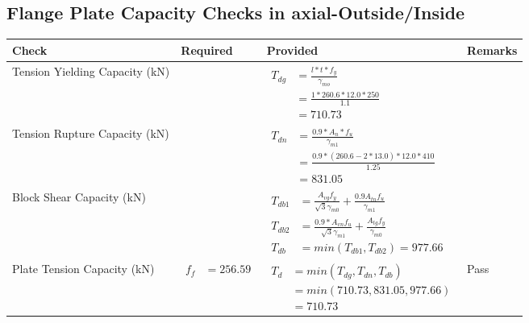 \documentclass{article}%
\begin{document}
\subsection{Flange Plate Capacity Checks in axial{-}Outside/Inside }%
\label{subsec:FlangePlateCapacityChecksinaxial{-}Outside/Inside}%
\renewcommand{\arraystretch}{1.2}%
\begin{longtable}{|p{4cm}|p{6cm}|p{5.5cm}|p{1.5cm}|}%
\hline%
\rowcolor{OsdagGreen}%
Check&Required&Provided&Remarks\\%
\hline%
\endhead%
\hline%
Tension Yielding Capacity (kN)&&$\begin{aligned} T_{dg} &= \frac{l*t*f_y}{\gamma_{mo}}\\ &=\frac{1*260.6*12.0*250}{1.1}\\ &=710.73\end{aligned}$&\\%
\hline%
Tension Rupture Capacity (kN)&&$\begin{aligned} T_{dn} &= \frac{0.9*A_{n}*f_u}{\gamma_{m1}}\\ &=\frac{0.9*(260.6-2*13.0)*12.0*410}{1.25}\\ &=831.05\end{aligned}$&\\%
\hline%
Block Shear Capacity (kN)&&$\begin{aligned}T_{db1} &= \frac{A_{vg} f_{y}}{\sqrt{3} \gamma_{m0}} + \frac{0.9 A_{tn} f_{u}}{\gamma_{m1}}\\ T_{db2} &= \frac{0.9*A_{vn} f_{u}}{\sqrt{3} \gamma_{m1}} + \frac{A_{tg} f_{y}}{\gamma_{m0}}\\ T_{db} &= min(T_{db1}, T_{db2})= 977.66\end{aligned}$&\\%
\hline%
Plate Tension Capacity (kN)&$\begin{aligned} f_f &=256.59\end{aligned}$&$\begin{aligned} T_d &= min(T_{dg},T_{dn},T_{db})\\ &= min(710.73,831.05,977.66)\\ &=710.73\end{aligned}$&Pass\\%
\hline%
\end{longtable}

%
\newpage%
\end{document}
